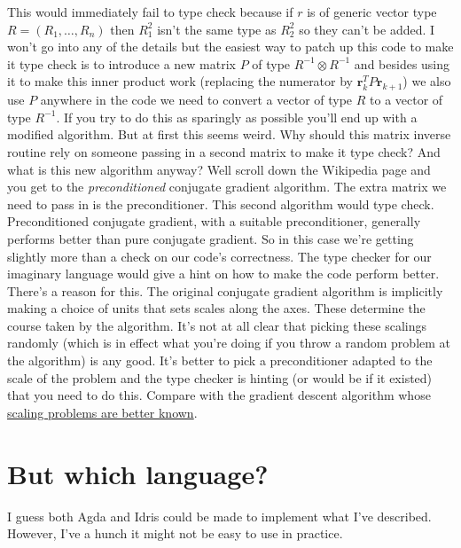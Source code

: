\documentclass[12pt]{article}
\begin{document}
This would immediately fail to type check because if $r$ is of generic vector type $R=(R_1,\ldots,R_n)$ then $R_1^2$ isn't the same type as $R_2^2$ so they can't be added.
I won't go into any of the details but the easiest way to patch up this code to make it type check is to introduce a new matrix $P$ of type $R^{-1}\otimes R^{-1}$ and besides using it to make this inner product work (replacing the numerator by $\mathbf{r}_k^T P\mathbf{r}_{k+1}$) we also use $P$ anywhere in the code we need to convert a vector of type $R$ to a vector of type $R^{-1}$.
If you try to do this as sparingly as possible you'll end up with a modified algorithm.
But at first this seems weird.
Why should this matrix inverse routine rely on someone passing in a second matrix to make it type check?
And what is this new algorithm anyway?
Well scroll down the Wikipedia page and you get to the {\it preconditioned} conjugate gradient algorithm.
The extra matrix we need to pass in is the preconditioner.
This second algorithm would type check.
Preconditioned conjugate gradient, with a suitable preconditioner, generally performs better than pure conjugate gradient.
So in this case we're getting slightly more than a check on our code's correctness.
The type checker for our imaginary language would give a hint on how to make the code perform better.
There's a reason for this.
The original conjugate gradient algorithm is implicitly making a choice of units that sets scales along the axes.
These determine the course taken by the algorithm.
It's not at all clear that picking these scalings randomly (which is in effect what you're doing if you throw a random problem at the algorithm) is any good.
It's better to pick a preconditioner adapted to the scale of the problem and the type checker is hinting (or would be if it existed) that you need to do this.
Compare with the gradient descent algorithm whose \href{http://www.machinedlearnings.com/2011/06/dimensional-analysis-and-gradient.html}{scaling problems are better known}.

\section{But which language?}
I guess both Agda and Idris could be made to implement what I've described.
However, I've a hunch it might not be easy to use in practice.
\end{document}
